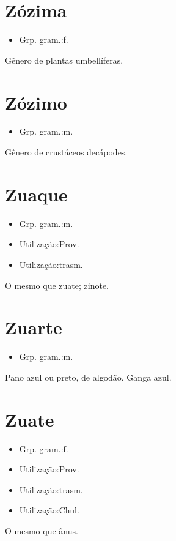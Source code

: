 \section{Zózima}
\begin{itemize}
\item {Grp. gram.:f.}
\end{itemize}
Gênero de plantas umbellíferas.
\section{Zózimo}
\begin{itemize}
\item {Grp. gram.:m.}
\end{itemize}
Gênero de crustáceos decápodes.
\section{Zuaque}
\begin{itemize}
\item {Grp. gram.:m.}
\end{itemize}
\begin{itemize}
\item {Utilização:Prov.}
\end{itemize}
\begin{itemize}
\item {Utilização:trasm.}
\end{itemize}
O mesmo que \textunderscore zuate\textunderscore ; zinote.
\section{Zuarte}
\begin{itemize}
\item {Grp. gram.:m.}
\end{itemize}
Pano azul ou preto, de algodão.
Ganga azul.
\section{Zuate}
\begin{itemize}
\item {Grp. gram.:f.}
\end{itemize}
\begin{itemize}
\item {Utilização:Prov.}
\end{itemize}
\begin{itemize}
\item {Utilização:trasm.}
\end{itemize}
\begin{itemize}
\item {Utilização:Chul.}
\end{itemize}
O mesmo que \textunderscore ânus\textunderscore .
